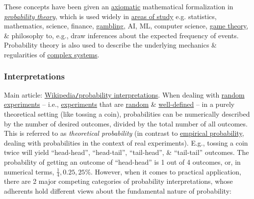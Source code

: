 \documentclass{article}
\begin{document}
These concepts have been given an \href{https://en.wikipedia.org/wiki/Probability_axioms}{axiomatic} mathematical formalization in \href{https://en.wikipedia.org/wiki/Probability_theory}{\it probability theory}, which is used widely in \href{https://en.wikipedia.org/wiki/Areas_of_study}{areas of study} e.g. statistics, mathematics, science, finance, \href{https://en.wikipedia.org/wiki/Gambling}{gambling}, AI, ML, computer science, \href{https://en.wikipedia.org/wiki/Game_theory}{game theory}, \& philosophy to, e.g., draw inferences about the expected frequency of events. Probability theory is also used to describe the underlying mechanics \& regularities of \href{https://en.wikipedia.org/wiki/Complex_systems}{complex systems}.

\subsubsection{Interpretations}
Main article: \href{https://en.wikipedia.org/wiki/Probability_interpretations}{Wikipedia{\tt/}probability interpretations}. When dealing with \href{https://en.wikipedia.org/wiki/Experiment_(probability_theory)}{random experiments} -- i.e., \href{https://en.wikipedia.org/wiki/Experiment}{experiments} that are \href{https://en.wikipedia.org/wiki/Randomness}{random} \& \href{https://en.wikipedia.org/wiki/Well-defined_expression}{well-defined} -- in a purely theoretical setting (like tossing a coin), probabilities can be numerically described by the number of desired outcomes, divided by the total number of all outcomes. This is referred to as {\it theoretical probability} (in contrast to \href{https://en.wikipedia.org/wiki/Empirical_probability}{empirical probability}, dealing with probabilities in the context of real experiments). E.g., tossing a coin twice will yield ``head-head'', ``head-tail'', ``tail-head'', \& ``tail-tail'' outcomes. The probability of getting an outcome of ``head-head'' is 1 out of 4 outcomes, or, in numerical terms, $\frac{1}{4},0.25,25\%$. However, when it comes to practical application, there are 2 major competing categories of probability interpretations, whose adherents hold different views about the fundamental nature of probability:
\end{document}
